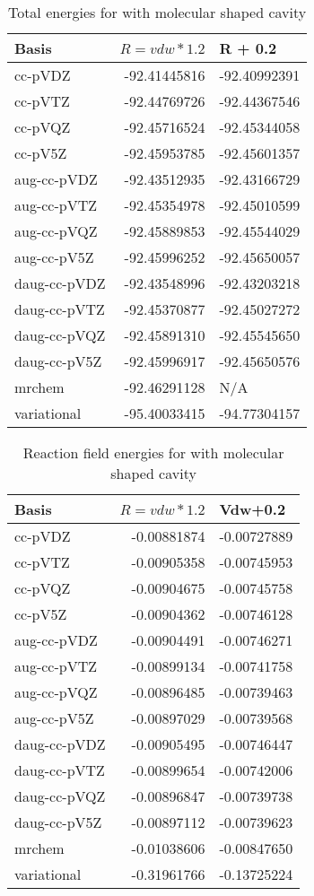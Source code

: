 \documentclass[../Thesis.tex]{subfiles}
\begin{document}
\begin{table}[htbp]
\caption{Total energies for  with molecular shaped cavity}
\begin{tabular}{l|r|r}
Basis & \multicolumn{1}{l|}{$R = vdw*1.2$} & \multicolumn{1}{l|}{R + 0.2} \\ \hline
cc-pVDZ & -92.41445816 & -92.40992391 \\
cc-pVTZ & -92.44769726 & -92.44367546 \\
cc-pVQZ & -92.45716524 & -92.45344058 \\
cc-pV5Z & -92.45953785 & -92.45601357 \\ \hline
aug-cc-pVDZ & -92.43512935 & -92.43166729 \\
aug-cc-pVTZ & -92.45354978 & -92.45010599 \\
aug-cc-pVQZ & -92.45889853 & -92.45544029 \\
aug-cc-pV5Z & -92.45996252 & -92.45650057 \\ \hline
daug-cc-pVDZ & -92.43548996 & -92.43203218 \\
daug-cc-pVTZ & -92.45370877 & -92.45027272 \\
daug-cc-pVQZ & -92.45891310 & -92.45545650 \\
daug-cc-pV5Z & -92.45996917 & -92.45650576 \\ \hline
mrchem & -92.46291128 & \multicolumn{1}{l|}{N/A} \\
variational & -95.40033415 & -94.77304157 \\
\end{tabular}
\label{tab:cyanrawdataabc}
\end{table}

\begin{table}[htbp]
\caption{Reaction field  energies for  with molecular shaped cavity}
\begin{tabular}{l|r|r}
Basis & \multicolumn{1}{l|}{$R = vdw*1.2$} & \multicolumn{1}{l|}{Vdw+0.2} \\ \hline
cc-pVDZ & -0.00881874 & -0.00727889 \\
cc-pVTZ & -0.00905358 & -0.00745953 \\
cc-pVQZ & -0.00904675 & -0.00745758 \\
cc-pV5Z & -0.00904362 & -0.00746128 \\ \hline
aug-cc-pVDZ & -0.00904491 & -0.00746271 \\
aug-cc-pVTZ & -0.00899134 & -0.00741758 \\
aug-cc-pVQZ & -0.00896485 & -0.00739463 \\
aug-cc-pV5Z & -0.00897029 & -0.00739568 \\ \hline
daug-cc-pVDZ & -0.00905495 & -0.00746447 \\
daug-cc-pVTZ & -0.00899654 & -0.00742006 \\
daug-cc-pVQZ & -0.00896847 & -0.00739738 \\
daug-cc-pV5Z & -0.00897112 & -0.00739623 \\ \hline
mrchem & -0.01038606 & -0.00847650 \\
variational & -0.31961766 & -0.13725224 \\
\end{tabular}
\label{tab:abcErwat}
\end{table}
\end{document}
